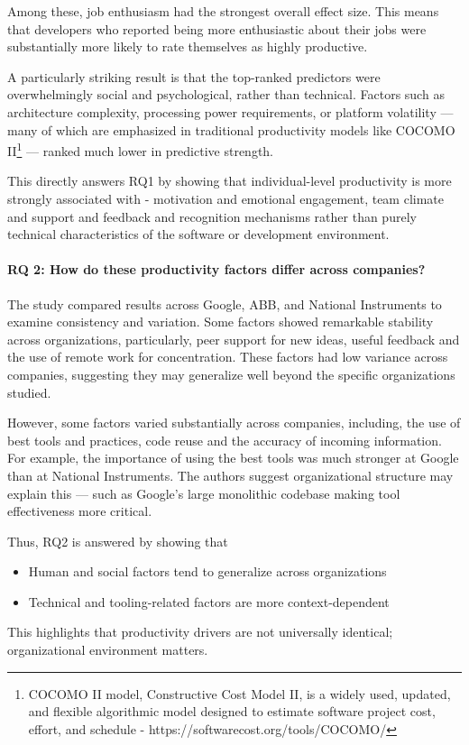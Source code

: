 Among these, job enthusiasm had the strongest overall effect size. This means that developers who reported being more enthusiastic about their jobs were substantially more likely to rate themselves as highly productive.

A particularly striking result is that the top-ranked predictors were overwhelmingly social and psychological, rather than technical. Factors such as architecture complexity, processing power requirements, or platform volatility — many of which are emphasized in traditional productivity models like COCOMO II\footnote{COCOMO II model, Constructive Cost Model II, is a widely used, updated, and flexible algorithmic model designed to estimate software project cost, effort, and schedule - https://softwarecost.org/tools/COCOMO/} — ranked much lower in predictive strength.

This directly answers RQ1 by showing that individual-level productivity is more strongly associated with - motivation and emotional engagement, team climate and support and feedback and recognition mechanisms rather than purely technical characteristics of the software or development environment.

\paragraph{RQ 2: How do these productivity factors differ across companies?}

The study compared results across Google, ABB, and National Instruments to examine consistency and variation. Some factors showed remarkable stability across organizations, particularly, peer support for new ideas, useful feedback and the use of remote work for concentration. These factors had low variance across companies, suggesting they may generalize well beyond the specific organizations studied.

However, some factors varied substantially across companies, including, the use of best tools and practices, code reuse and the accuracy of incoming information. For example, the importance of using the best tools was much stronger at Google than at National Instruments. The authors suggest organizational structure may explain this — such as Google's large monolithic codebase making tool effectiveness more critical.

Thus, RQ2 is answered by showing that
\begin{itemize}
    \item Human and social factors tend to generalize across organizations
    \item Technical and tooling-related factors are more context-dependent
\end{itemize}
This highlights that productivity drivers are not universally identical; organizational environment matters.

